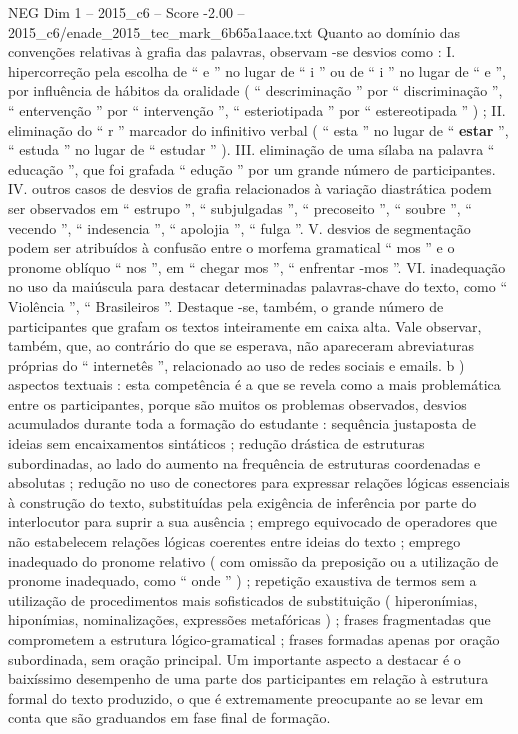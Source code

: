 \begin{textsample}{NEG Dim 1 – 2015\_c6 – Score -2.00 – 2015\_c6/enade\_2015\_tec\_mark\_6b65a1aace.txt}
Quanto ao domínio das convenções relativas à grafia das palavras, observam -se desvios como : I. hipercorreção pela escolha de “ e ” no lugar de “ i ” ou de “ i ” no lugar de “ e ”, por influência de hábitos da oralidade ( “ descriminação ” por “ discriminação ”, “ entervenção ” por “ intervenção ”, “ esteriotipada ” por “ estereotipada ” ) ; II. eliminação do “ r ” marcador do infinitivo verbal ( “ esta ” no lugar de “ \textbf{estar} ”, “ estuda ” no lugar de “ estudar ” ).
III. eliminação de uma sílaba na palavra “ educação ”, que foi grafada “ edução ” por um grande número de participantes.
IV. outros casos de desvios de grafia relacionados à variação diastrática podem ser observados em “ estrupo ”, “ subjulgadas ”, “ precoseito ”, “ soubre ”, “ vecendo ”, “ indesencia ”, “ apolojia ”, “ fulga ”.
V. desvios de segmentação podem ser atribuídos à confusão entre o morfema gramatical “ mos ” e o pronome oblíquo “ nos ”, em “ chegar mos ”, “ enfrentar -mos ”.
VI. inadequação no uso da maiúscula para destacar determinadas palavras-chave do texto, como “ Violência ”, “ Brasileiros ”.
Destaque -se, também, o grande número de participantes que grafam os textos inteiramente em caixa alta.
Vale observar, também, que, ao contrário do que se esperava, não apareceram abreviaturas próprias do “ internetês ”, relacionado ao uso de redes sociais e emails. b ) aspectos textuais : esta competência é a que se revela como a mais problemática entre os participantes, porque são muitos os problemas observados, desvios acumulados durante toda a formação do estudante : sequência justaposta de ideias sem encaixamentos sintáticos ; redução drástica de estruturas subordinadas, ao lado do aumento na frequência de estruturas coordenadas e absolutas ; redução no uso de conectores para expressar relações lógicas essenciais à construção do texto, substituídas pela exigência de inferência por parte do interlocutor para suprir a sua ausência ; emprego equivocado de operadores que não estabelecem relações lógicas coerentes entre ideias do texto ; emprego inadequado do pronome relativo ( com omissão da preposição ou a utilização de pronome inadequado, como “ onde ” ) ; repetição exaustiva de termos sem a utilização de procedimentos mais sofisticados de substituição ( hiperonímias, hiponímias, nominalizações, expressões metafóricas ) ; frases fragmentadas que comprometem a estrutura lógico-gramatical ; frases formadas apenas por oração subordinada, sem oração principal.
Um importante aspecto a destacar é o baixíssimo desempenho de uma parte dos participantes em relação à estrutura formal do texto produzido, o que é extremamente preocupante ao se levar em conta que são graduandos em fase final de formação.

\end{textsample}
